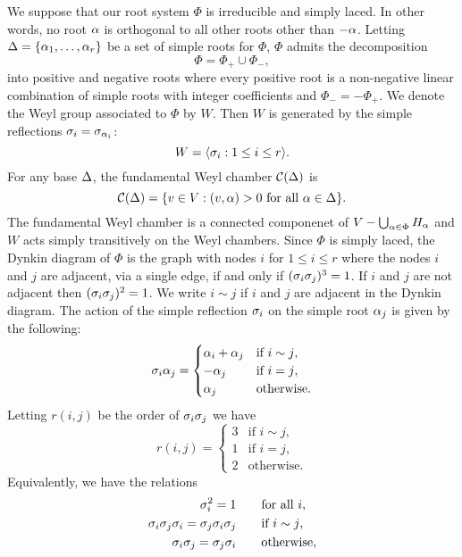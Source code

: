 \documentclass[12pt,reqno,oneside]{amsart}
\begin{document}
        We suppose that our root system $\Phi$ is irreducible and simply laced. In other words, no root $\alpha$ is orthogonal to all other roots other than $-\alpha$. Letting $\Delta = \{\alpha_{1},\ldots,\alpha_{r}\}$ be a set of simple roots for $\Phi$, $\Phi$ admits the decomposition
        \[
            \Phi = \Phi_{+} \cup \Phi_{-},
        \]
        into positive and negative roots where every positive root is a non-negative linear combination of simple roots with integer coefficients and $\Phi_{-} = -\Phi_{+}$. We denote the Weyl group associated to $\Phi$ by $W$. Then $W$ is generated by the simple reflections $\sigma_{i} = \sigma_{\alpha_{i}}$:
        \[
            W = \langle\sigma_{i}:1 \le i \le r\rangle.
        \]
        For any base $\Delta$, the fundamental Weyl chamber $\mathcal{C}(\Delta)$ is
        \[
            \mathcal{C}(\Delta) = \{v \in V:(v,\alpha) > 0 \text{ for all } \alpha \in \Delta\}.
        \]
        The fundamental Weyl chamber is a connected componenet of $V-\bigcup_{\alpha \in \Phi}H_{\alpha}$ and $W$ acts simply transitively on the Weyl chambers. Since $\Phi$ is simply laced, the Dynkin diagram of $\Phi$ is the graph with nodes $i$ for $1 \le i \le r$ where the nodes $i$ and $j$ are adjacent, via a single edge, if and only if $(\sigma_{i}\sigma_{j})^{3} = 1$. If $i$ and $j$ are not adjacent then $(\sigma_{i}\sigma_{j})^{2} = 1$. We write $i \sim j$ if $i$ and $j$ are adjacent in the Dynkin diagram. The action of the simple reflection $\sigma_{i}$ on the simple root $\alpha_{j}$ is given by the following:
        \[
            \sigma_{i}\alpha_{j} = \begin{cases} \alpha_{i}+\alpha_{j} & \text{if $i \sim j$}, \\ -\alpha_{j} & \text{if $i = j$}, \\ \alpha_{j} & \text{otherwise}. \end{cases}
        \]
        Letting $r(i,j)$ be the order of $\sigma_{i}\sigma_{j}$ we have
        \[
            r(i,j) = \begin{cases} 3 & \text{if $i \sim j$}, \\ 1 & \text{if $i = j$}, \\ 2 & \text{otherwise}. \end{cases}
        \]
        Equivalently, we have the relations
        \begin{align*}
            \sigma_{i}^{2} = 1 \qquad &\text{for all $i$}, \\
            \sigma_{i}\sigma_{j}\sigma_{i} = \sigma_{j}\sigma_{i}\sigma_{j} \qquad &\text{if $i \sim j$}, \\
            \sigma_{i}\sigma_{j} = \sigma_{j}\sigma_{i} \qquad &\text{otherwise},
        \end{align*}
\end{document}
